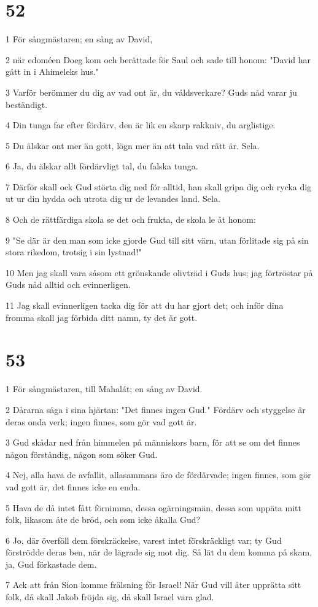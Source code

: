 \chapter{52}

\par 1 För sångmästaren; en sång av David,
\par 2 när edoméen Doeg kom och berättade för Saul och sade till honom: "David har gått in i Ahimeleks hus."
\par 3 Varför berömmer du dig av vad ont är, du våldsverkare? Guds nåd varar ju beständigt.
\par 4 Din tunga far efter fördärv, den är lik en skarp rakkniv, du arglistige.
\par 5 Du älskar ont mer än gott, lögn mer än att tala vad rätt är. Sela.
\par 6 Ja, du älskar allt fördärvligt tal, du falska tunga.
\par 7 Därför skall ock Gud störta dig ned för alltid, han skall gripa dig och rycka dig ut ur din hydda och utrota dig ur de levandes land. Sela.
\par 8 Och de rättfärdiga skola se det och frukta, de skola le åt honom:
\par 9 "Se där är den man som icke gjorde Gud till sitt värn, utan förlitade sig på sin stora rikedom, trotsig i sin lystnad!"
\par 10 Men jag skall vara såsom ett grönskande olivträd i Guds hus; jag förtröstar på Guds nåd alltid och evinnerligen.
\par 11 Jag skall evinnerligen tacka dig för att du har gjort det; och inför dina fromma skall jag förbida ditt namn, ty det är gott.

\chapter{53}

\par 1 För sångmästaren, till Mahalát; en sång av David.
\par 2 Dårarna säga i sina hjärtan: "Det finnes ingen Gud." Fördärv och styggelse är deras onda verk; ingen finnes, som gör vad gott är.
\par 3 Gud skådar ned från himmelen på människors barn, för att se om det finnes någon förståndig, någon som söker Gud.
\par 4 Nej, alla hava de avfallit, allasammans äro de fördärvade; ingen finnes, som gör vad gott är, det finnes icke en enda.
\par 5 Hava de då intet fått förnimma, dessa ogärningsmän, dessa som uppäta mitt folk, likasom åte de bröd, och som icke åkalla Gud?
\par 6 Jo, där överföll dem förskräckelse, varest intet förskräckligt var; ty Gud förströdde deras ben, när de lägrade sig mot dig. Så lät du dem komma på skam, ja, Gud förkastade dem.
\par 7 Ack att från Sion komme frälsning för Israel! När Gud vill åter upprätta sitt folk, då skall Jakob fröjda sig, då skall Israel vara glad.


